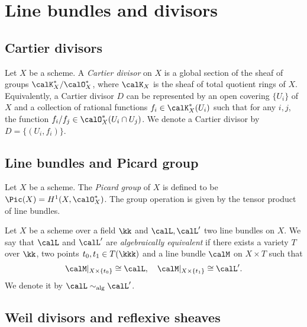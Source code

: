 \section{Line bundles and divisors}

\subsection{Cartier divisors}

    \begin{definition}\label{def:Cartier_divisor}
        Let \(X\) be a scheme. 
        A \emph{Cartier divisor} on \(X\) is a global section of the sheaf of groups \(\calK_X^*/\calO_X^*\), where \(\calK_X\) is the sheaf of total quotient rings of \(X\).
        Equivalently, a Cartier divisor \(D\) can be represented by an open covering \(\{U_i\}\) of \(X\) and a collection of rational functions \(f_i \in \calK_X^*(U_i)\) such that for any \(i, j\), the function \(f_i/f_j \in \calO_X^*(U_i \cap U_j)\).
        We denote a Cartier divisor by \(D = \{(U_i, f_i)\}\).
    \end{definition}

\subsection{Line bundles and Picard group}

    \begin{definition}\label{def:picard_group}
        Let \(X\) be a scheme. 
        The \emph{Picard group} of \(X\) is defined to be \(\Pic(X) = H^1(X, \calO_X^*)\).
        The group operation is given by the tensor product of line bundles.
    \end{definition}

    \begin{definition}\label{def:algebraically_equivalent_line_bundles}
        Let \(X\) be a scheme over a field \(\kk\) and \(\calL, \calL'\) two line bundles on \(X\).
        We say that \(\calL\) and \(\calL'\) are \emph{algebraically equivalent} if there exists a  variety \(T\) over \(\kk\), two points \(t_0, t_1 \in T(\kkk)\) and a line bundle \(\calM\) on \(X \times T\) such that 
        \[ \calM|_{X \times \{t_0\}} \cong \calL, \quad \calM|_{X \times \{t_1\}} \cong \calL'. \]
        We denote it by \(\calL \sim_{\text{alg}} \calL'\).
    \end{definition}

\subsection{Weil divisors and reflexive sheaves}

